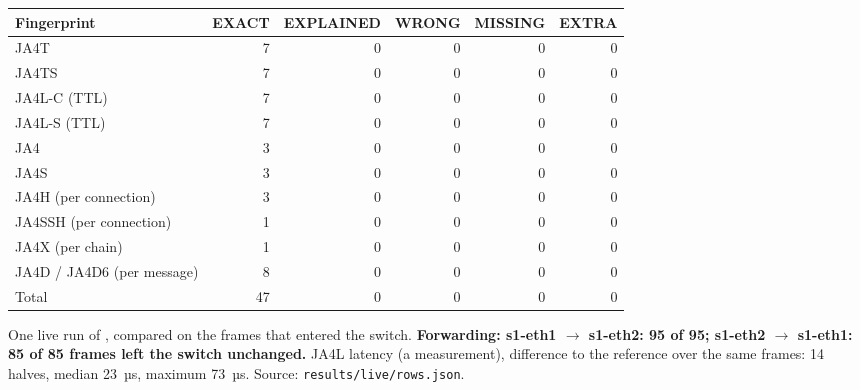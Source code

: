 \begin{center}\begin{tabular}{lrrrrr}\toprule
\textbf{Fingerprint} & \textbf{EXACT} & \textbf{EXPLAINED} & \textbf{WRONG} & \textbf{MISSING} & \textbf{EXTRA}\\\midrule
JA4T & 7 & 0 & 0 & 0 & 0\\
JA4TS & 7 & 0 & 0 & 0 & 0\\
JA4L-C (TTL) & 7 & 0 & 0 & 0 & 0\\
JA4L-S (TTL) & 7 & 0 & 0 & 0 & 0\\
JA4 & 3 & 0 & 0 & 0 & 0\\
JA4S & 3 & 0 & 0 & 0 & 0\\
JA4H (per connection) & 3 & 0 & 0 & 0 & 0\\
JA4SSH (per connection) & 1 & 0 & 0 & 0 & 0\\
JA4X (per chain) & 1 & 0 & 0 & 0 & 0\\
JA4D / JA4D6 (per message) & 8 & 0 & 0 & 0 & 0\\
\midrule Total & 47 & 0 & 0 & 0 & 0\\\bottomrule\end{tabular}\end{center}
One live run of , compared on the frames that entered the switch. \textbf{Forwarding: s1-eth1 $\to$ s1-eth2: 95 of 95; s1-eth2 $\to$ s1-eth1: 85 of 85 frames left the switch unchanged.} JA4L latency (a measurement), difference to the reference over the same frames: 14 halves, median 23~µs, maximum 73~µs. Source: \texttt{results/live/rows.json}.
